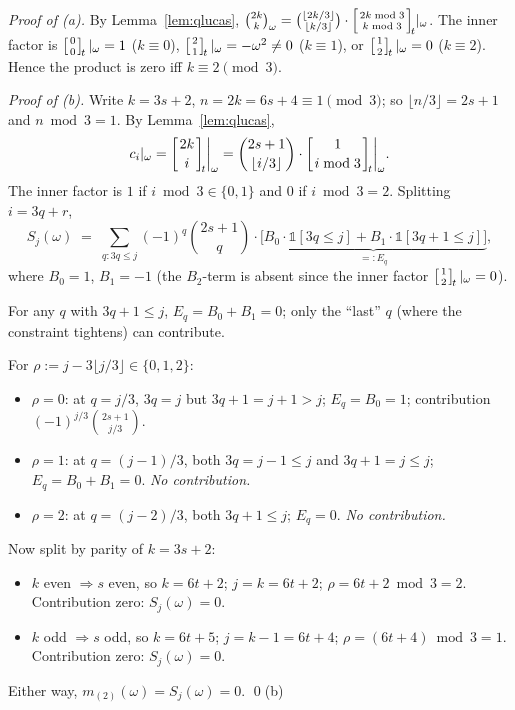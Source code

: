 \documentclass[11pt]{article}
\theoremstyle{definition}
\theoremstyle{remark}
\newcommand{\qbinom}[2]{\left[{#1 \atop #2}\right]_{\!t}}
\begin{document}
\medskip
\emph{Proof of (a).} By Lemma~\ref{lem:qlucas},
$\binom{2k}{k}_\omega = \binom{\lfloor 2k/3 \rfloor}{\lfloor k/3 \rfloor} \cdot \qbinom{2k \bmod 3}{k \bmod 3}\!|_\omega$.
The inner factor is $\qbinom{0}{0}|_\omega = 1$ ($k \equiv 0$),
$\qbinom{2}{1}|_\omega = -\omega^2 \ne 0$ ($k \equiv 1$), or
$\qbinom{1}{2}|_\omega = 0$ ($k \equiv 2$). Hence the product is zero
iff $k \equiv 2 \pmod 3$.

\medskip
\emph{Proof of (b).} Write $k = 3s + 2$, $n = 2k = 6s + 4 \equiv 1 \pmod 3$; so
$\lfloor n/3 \rfloor = 2s + 1$ and $n \bmod 3 = 1$.
By Lemma~\ref{lem:qlucas},
\[
c_i|_\omega = \qbinom{2k}{i}\!\bigg|_\omega
= \binom{2s+1}{\lfloor i/3 \rfloor} \cdot \qbinom{1}{i \bmod 3}\!\bigg|_\omega.
\]
The inner factor is $1$ if $i \bmod 3 \in \{0, 1\}$ and $0$ if $i \bmod 3 = 2$.
Splitting $i = 3q + r$,
\[
S_j(\omega) \;=\; \sum_{q : 3q \le j} (-1)^q \binom{2s+1}{q} \cdot
\underbrace{\bigl[ B_0 \cdot \mathbb{1}[3q \le j] + B_1 \cdot \mathbb{1}[3q+1 \le j] \bigr]}_{=: E_q},
\]
where $B_0 = 1$, $B_1 = -1$ (the $B_2$-term is absent since the inner factor $\qbinom{1}{2}|_\omega = 0$).

For any $q$ with $3q + 1 \le j$, $E_q = B_0 + B_1 = 0$; only the ``last'' $q$ (where the constraint tightens) can contribute.

For $\rho := j - 3\lfloor j/3\rfloor \in \{0, 1, 2\}$:
\begin{itemize}
\item $\rho = 0$: at $q = j/3$, $3q = j$ but $3q + 1 = j + 1 > j$; $E_q = B_0 = 1$; contribution $(-1)^{j/3} \binom{2s+1}{j/3}$.
\item $\rho = 1$: at $q = (j-1)/3$, both $3q = j-1 \le j$ and $3q+1 = j \le j$; $E_q = B_0 + B_1 = 0$. \emph{No contribution.}
\item $\rho = 2$: at $q = (j-2)/3$, both $3q + 1 \le j$; $E_q = 0$. \emph{No contribution.}
\end{itemize}

Now split by parity of $k = 3s+2$:
\begin{itemize}
\item $k$ even $\Longrightarrow s$ even, so $k = 6t + 2$; $j = k = 6t+2$; $\rho = 6t+2 \bmod 3 = 2$. Contribution zero: $S_j(\omega) = 0$.
\item $k$ odd $\Longrightarrow s$ odd, so $k = 6t + 5$; $j = k - 1 = 6t + 4$; $\rho = (6t+4) \bmod 3 = 1$. Contribution zero: $S_j(\omega) = 0$.
\end{itemize}

Either way, $m_{(2)}(\omega) = S_j(\omega) = 0$. \qed (b)
\end{document}
